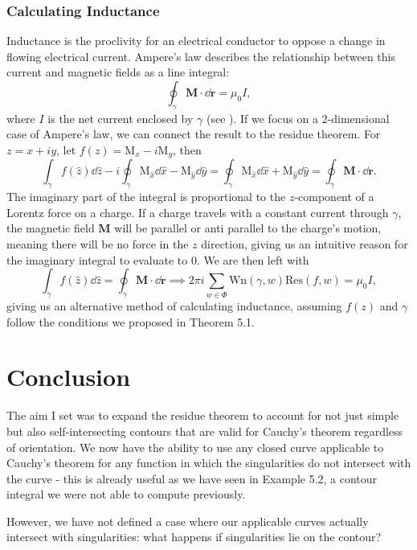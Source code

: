 \documentclass[a4paper]{article}
\def\Res{\text{Res}}
\def\Wind{\text{Wn}}
\begin{document}
\subsubsection{Calculating Inductance}

Inductance is the proclivity for an electrical conductor to oppose a change in flowing electrical current. Ampere's law describes the relationship between this current and magnetic fields as a line integral:
\[\oint_{\gamma}\mathbf{M} \cdot \dd \mathbf{r} = \mu_{0}I,\]
where $I$ is the net current enclosed by $\gamma$  (see \citep[p.2-3]{Magnets}). If we focus on a 2-dimensional case of Ampere's law, we can connect the result to the residue theorem. For $z=x+iy$, let $f(z) = \text{M}_{x} - i\text{M}_{y}$, then
\[\int_{\gamma} f(\hat{z}) \dd \hat{z} - i\oint_{\gamma} \text{M}_{\hat{x}} \dd \hat{x} - \text{M}_{\hat{y}} \dd \hat{y}= \oint_{\gamma} \text{M}_{\hat{x}} \dd \hat{x} + \text{M}_{\hat{y}} \dd \hat{y} = \oint_{\gamma}\mathbf{M} \cdot \dd \mathbf{r}.\]
The imaginary part of the integral is proportional to the $z$-component of a Lorentz force on a charge. If a charge travels with a constant current through $\gamma$, the magnetic field $\mathbf{M}$ will be parallel or anti parallel to the charge's motion, meaning there will be no force in the $z$ direction, giving us an intuitive reason for the imaginary integral to evaluate to $0$. We are then left with
\[\int_{\gamma} f(\hat{z}) \dd \hat{z} = \oint_{\gamma}\mathbf{M} \cdot \dd \mathbf{r} \implies 2 \pi i \sum_{w \in \Phi} \Wind (\gamma,w) \Res (f,w) = \mu_{0}I, \]
giving us an alternative method of calculating inductance, assuming $f(z)$ and $\gamma$ follow the conditions we proposed in Theorem 5.1.

\section{Conclusion}

The aim I set was to expand the residue theorem to account for not just simple but also self-intersecting contours that are valid for Cauchy's theorem regardless of orientation. We now have the ability to use any closed curve applicable to Cauchy's theorem for any function in which the singularities do not intersect with the curve - this is already useful as we have seen in Example 5.2, a contour integral we were not able to compute previously. 

However, we have not defined a case where our applicable curves actually intersect with singularities: what happens if singularities lie on the contour?
\end{document}
